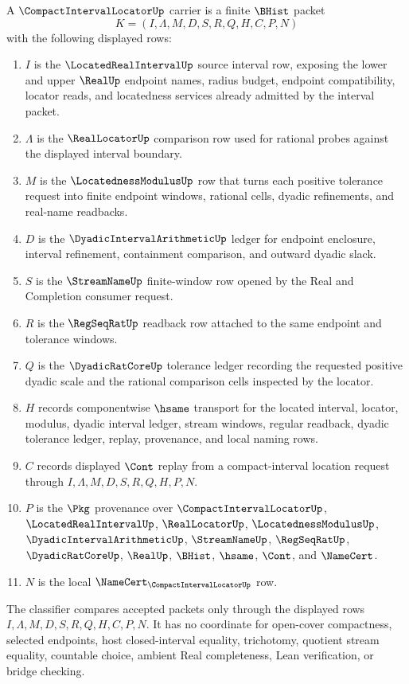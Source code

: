 \begin{definition}
\label{def:compact-interval-locator-carrier}
A $\CompactIntervalLocatorUp$ carrier is a finite $\BHist$ packet
$$
K=(I,\Lambda,M,D,S,R,Q,H,C,P,N)
$$
with the following displayed rows:
\begin{enumerate}
\item $I$ is the $\LocatedRealIntervalUp$ source interval row, exposing the lower and upper $\RealUp$ endpoint names, radius budget, endpoint compatibility, locator reads, and locatedness services already admitted by the interval packet.
\item $\Lambda$ is the $\RealLocatorUp$ comparison row used for rational probes against the displayed interval boundary.
\item $M$ is the $\LocatednessModulusUp$ row that turns each positive tolerance request into finite endpoint windows, rational cells, dyadic refinements, and real-name readbacks.
\item $D$ is the $\DyadicIntervalArithmeticUp$ ledger for endpoint enclosure, interval refinement, containment comparison, and outward dyadic slack.
\item $S$ is the $\StreamNameUp$ finite-window row opened by the Real and Completion consumer request.
\item $R$ is the $\RegSeqRatUp$ readback row attached to the same endpoint and tolerance windows.
\item $Q$ is the $\DyadicRatCoreUp$ tolerance ledger recording the requested positive dyadic scale and the rational comparison cells inspected by the locator.
\item $H$ records componentwise $\hsame$ transport for the located interval, locator, modulus, dyadic interval ledger, stream windows, regular readback, dyadic tolerance ledger, replay, provenance, and local naming rows.
\item $C$ records displayed $\Cont$ replay from a compact-interval location request through $I,\Lambda,M,D,S,R,Q,H,P,N$.
\item $P$ is the $\Pkg$ provenance over $\CompactIntervalLocatorUp$, $\LocatedRealIntervalUp$, $\RealLocatorUp$, $\LocatednessModulusUp$, $\DyadicIntervalArithmeticUp$, $\StreamNameUp$, $\RegSeqRatUp$, $\DyadicRatCoreUp$, $\RealUp$, $\BHist$, $\hsame$, $\Cont$, and $\NameCert$.
\item $N$ is the local $\NameCert_{\CompactIntervalLocatorUp}$ row.
\end{enumerate}
The classifier compares accepted packets only through the displayed rows $I,\Lambda,M,D,S,R,Q,H,C,P,N$. It has no coordinate for open-cover compactness, selected endpoints, host closed-interval equality, trichotomy, quotient stream equality, countable choice, ambient Real completeness, Lean verification, or bridge checking.
\end{definition}


